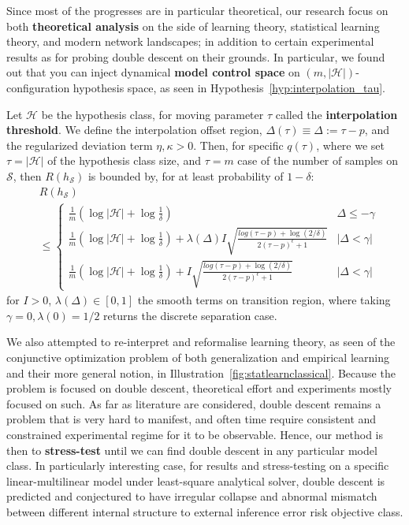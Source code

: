 \documentclass[
  journal=largetwo,
  year=2025,
  volume=37,
]{cup-journal}
\begin{document}
Since most of the progresses are in particular theoretical, our research focus on both \textbf{theoretical analysis} on the side of learning theory, statistical learning theory, and modern network landscapes; in addition to certain experimental results as for probing double descent on their grounds. In particular, we found out that you can inject dynamical \textbf{model control space} on $(m,|\mathcal{H}|)$-configuration hypothesis space, as seen in Hypothesis~\ref{hyp:interpolation_tau}.
\begin{hypothesis}\label{hyp:interpolation_tau}
    Let $\mathcal{H}$ be the hypothesis class, for moving parameter $\tau$ called the \textbf{interpolation threshold}. We define the interpolation offset region, $\Delta(\tau)\equiv\Delta := \tau-p$, and the regularized deviation term $\eta,\kappa>0$. Then, for specific $q(\tau)$, where we set $\tau=|\mathcal{H}|$ of the hypothesis class size, and $\tau=m$ case of the number of samples on $\mathcal{S}$, then $R(h_{\mathcal{S}})$ is bounded by, for at least probability of $1-\delta$: 
    \begin{equation}
        \begin{split}
            & R(h_{\mathcal{S}})\\
            &\leq \begin{cases}
            \frac{1}{m} \left( \log{|\mathcal{H}|} + \log{\frac{1}{\delta}} \right) & \Delta \leq -\gamma \\
            \frac{1}{m} \left( \log{|\mathcal{H}|} + \log{\frac{1}{\delta}} \right) + \lambda(\Delta) I \sqrt{\frac{log{(\tau - p)+\log{(2/\delta)}}}{2(\tau-p)^{\epsilon}+1}} & |\Delta <\gamma| \\
            \frac{1}{m} \left( \log{|\mathcal{H}|} + \log{\frac{1}{\delta}} \right) + I\sqrt{\frac{log{(\tau - p)+\log{(2/\delta)}}}{2(\tau-p)^{\epsilon}+1}} & |\Delta <\gamma| 
        \end{cases}
        \end{split}
    \end{equation}
    for $I>0$, $\lambda(\Delta)\in[0,1]$ the smooth terms on transition region, where taking $\gamma =0, \lambda(0)=1/2$ returns the discrete separation case. 
\end{hypothesis}
We also attempted to re-interpret and reformalise learning theory, as seen of the conjunctive optimization problem of both generalization and empirical learning and their more general notion, in Illustration~\ref{fig:statlearnclassical}. Because the problem is focused on double descent, theoretical effort and experiments mostly focused on such. As far as literature are considered, double descent remains a problem that is very hard to manifest, and often time require consistent and constrained experimental regime for it to be observable. Hence, our method is then to \textbf{stress-test} until we can find double descent in any particular model class. In particularly interesting case, for results and stress-testing on a specific linear-multilinear model under least-square analytical solver, double descent is predicted and conjectured to have irregular collapse and abnormal mismatch between different internal structure to external inference error risk objective class. 
\end{document}
